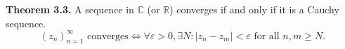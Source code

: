 \textbf{Theorem 3.3.} A sequence in $\mathbb{C}$ (or $\mathbb{R}$) converges if and only if it is a Cauchy sequence.
\[
(z_n)_{n=1}^{\infty} \text{ converges} \iff \forall \varepsilon > 0, \exists N: |z_n - z_m| < \varepsilon \text{ for all } n, m \geq N.
\]
